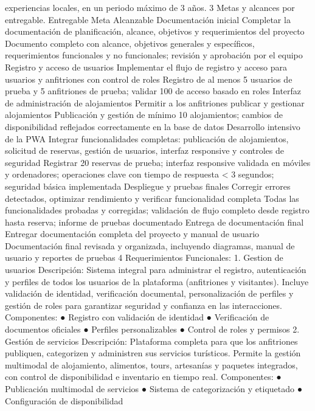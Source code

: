 experiencias locales, en un periodo máximo de 3 años.
3
Metas y alcances por entregable.
Entregable Meta Alcanzable
Documentación
inicial
Completar la documentación
de planificación, alcance,
objetivos y requerimientos
del proyecto
Documento completo con
alcance, objetivos generales y
específicos, requerimientos
funcionales y no funcionales;
revisión y aprobación por el
equipo
Registro y
acceso de
usuarios
Implementar el flujo de
registro y acceso para
usuarios y anfitriones con
control de roles
Registro de al menos 5 usuarios
de prueba y 5 anfitriones de
prueba; validar 100%
de acceso basado en roles
Interfaz de
administración
de
alojamientos
Permitir a los anfitriones
publicar y gestionar
alojamientos
Publicación y gestión de mínimo
10 alojamientos; cambios de
disponibilidad reflejados
correctamente en la base de
datos
Desarrollo
intensivo de la
PWA
Integrar funcionalidades
completas: publicación de
alojamientos, solicitud de
reservas, gestión de
usuarios, interfaz responsive
y controles de seguridad
Registrar 20 reservas de prueba;
interfaz responsive validada en
móviles y ordenadores;
operaciones clave con tiempo de
respuesta < 3 segundos;
seguridad básica implementada
Despliegue y
pruebas finales
Corregir errores detectados,
optimizar rendimiento y
verificar funcionalidad
completa
Todas las funcionalidades
probadas y corregidas; validación
de flujo completo desde registro
hasta reserva; informe de
pruebas documentado
Entrega de
documentación
final
Entregar documentación
completa del proyecto y
manual de usuario
Documentación final revisada y
organizada, incluyendo
diagramas, manual de usuario y
reportes de pruebas
4
Requerimientos
Funcionales:
1. Gestion de usuarios
Descripción: Sistema integral para administrar el registro, autenticación y perfiles
de todos los usuarios de la plataforma (anfitriones y visitantes). Incluye validación
de identidad, verificación documental, personalización de perfiles y gestión de
roles para garantizar seguridad y confianza en las interacciones.
Componentes:
● Registro con validación de identidad
● Verificación de documentos oficiales
● Perfiles personalizables
● Control de roles y permisos
2. Gestión de servicios
Descripción: Plataforma completa para que los anfitriones publiquen, categorizen
y administren sus servicios turísticos. Permite la gestión multimodal de
alojamiento, alimentos, tours, artesanías y paquetes integrados, con control de
disponibilidad e inventario en tiempo real.
Componentes:
● Publicación multimodal de servicios
● Sistema de categorización y etiquetado
● Configuración de disponibilidad
